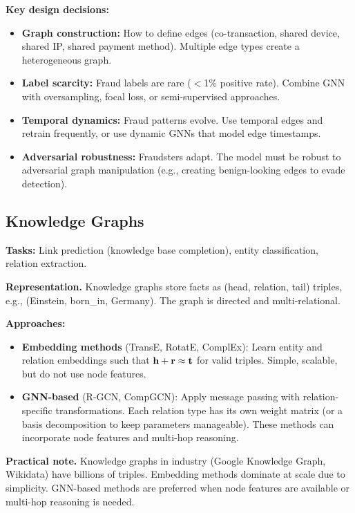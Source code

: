 \textbf{Key design decisions:}
\begin{itemize}
    \item \textbf{Graph construction:} How to define edges (co-transaction, shared device, shared IP, shared payment method). Multiple edge types create a heterogeneous graph.
    \item \textbf{Label scarcity:} Fraud labels are rare ($<$1\% positive rate). Combine GNN with oversampling, focal loss, or semi-supervised approaches.
    \item \textbf{Temporal dynamics:} Fraud patterns evolve. Use temporal edges and retrain frequently, or use dynamic GNNs that model edge timestamps.
    \item \textbf{Adversarial robustness:} Fraudsters adapt. The model must be robust to adversarial graph manipulation (e.g., creating benign-looking edges to evade detection).
\end{itemize}

\subsection{Knowledge Graphs}

\textbf{Tasks:} Link prediction (knowledge base completion), entity classification, relation extraction.

\textbf{Representation.} Knowledge graphs store facts as (head, relation, tail) triples, e.g., (Einstein, born\_in, Germany). The graph is directed and multi-relational.

\textbf{Approaches:}
\begin{itemize}
    \item \textbf{Embedding methods} (TransE, RotatE, ComplEx): Learn entity and relation embeddings such that $\mathbf{h} + \mathbf{r} \approx \mathbf{t}$ for valid triples. Simple, scalable, but do not use node features.
    \item \textbf{GNN-based} (R-GCN, CompGCN): Apply message passing with relation-specific transformations. Each relation type has its own weight matrix (or a basis decomposition to keep parameters manageable). These methods can incorporate node features and multi-hop reasoning.
\end{itemize}

\textbf{Practical note.} Knowledge graphs in industry (Google Knowledge Graph, Wikidata) have billions of triples. Embedding methods dominate at scale due to simplicity. GNN-based methods are preferred when node features are available or multi-hop reasoning is needed.

